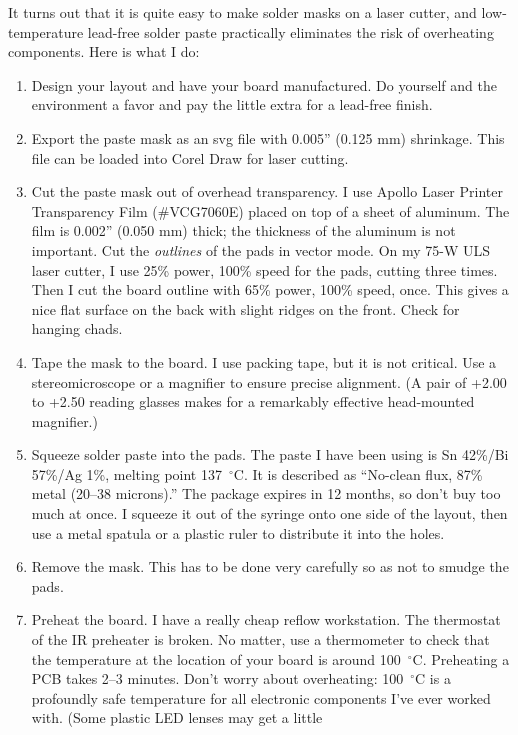 \documentclass[11pt]{report}
\def\degC{$^\circ$C}
\begin{document}
It turns out that it is quite easy to
make solder masks on a laser cutter, and low-temperature lead-free
solder paste practically eliminates the risk of overheating
components. Here is what I do:
\begin{enumerate}
\item Design your layout and have your board manufactured. Do yourself
  and the environment a favor and pay the little extra for a lead-free finish.
\item Export the paste mask as an svg file with 0.005'' (0.125 mm)
  shrinkage. This file can be loaded into Corel Draw for laser cutting.
  \item  Cut the paste mask out of overhead transparency. I use Apollo
    Laser Printer Transparency Film (\#VCG7060E) placed on top of a
    sheet of aluminum. The film is 0.002'' (0.050 mm) thick; the
    thickness of the aluminum is not important. Cut the \emph{outlines} of
    the pads in vector mode. On my 75-W ULS laser cutter, I use 25\%
    power, 100\% speed for the pads, cutting three
    times. Then I cut the board outline with 65\% power, 100\% speed,
    once. This gives a nice flat surface on the back with slight
    ridges on the front. Check for hanging chads.
  \item Tape the mask to the board. I use packing tape, but it is
    not critical. Use a stereomicroscope or a magnifier to ensure
    precise alignment. (A pair of +2.00 to +2.50 reading glasses
    makes for a remarkably effective head-mounted magnifier.)
  \item Squeeze solder paste into the pads. The paste I have been
    using is Sn 42\%/Bi 57\%/Ag 1\%, melting point 137~\degC{}. It
    is described as ``No-clean flux, 87\% metal (20--38 microns).''
    The package expires in 12 months, so don't buy too much at once. I
    squeeze it out of the syringe onto one side of the layout, then
    use a metal spatula or a plastic ruler to distribute it into the holes.
  \item Remove the mask. This  has to be done very carefully so as not
    to smudge the pads.
  \item Preheat the board. I have a really cheap reflow
    workstation. The thermostat of the IR preheater is broken. No
    matter, use a thermometer to check that the temperature at the
    location of your board is around 100~\degC{}. Preheating a PCB
    takes 2--3 minutes. Don't worry about overheating: 100~\degC{}
    is a profoundly safe temperature for all electronic components
    I've ever worked with. (Some plastic LED lenses may get a little

\end{enumerate}
\end{document}
